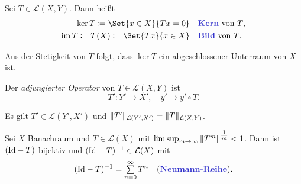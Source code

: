 \documentclass{cheat-sheet}
\newcommand{\K}{\mathbb{K}}
\newcommand{\Leb}{\mathcal{L}} %
\newcommand{\LSO}{\mathcal{L}} %
\begin{document}

\begin{defn}
  Sei $T \in \LSO(X, Y)$. Dann heißt
  \begin{align*}
    \ker T \coloneqq \Set{ x \in X }{ Tx = 0 } \quad &\text{\emph{Kern} von $T$,}\\
    \im T \coloneqq T(X) \coloneqq \Set{ Tx }{ x \in X } \quad &\text{\emph{Bild} von $T$.}
  \end{align*}
\end{defn}

\begin{bem}
  Aus der Stetigkeit von $T$ folgt, dass $\ker T$ ein abgeschlossener Unterraum von $X$ ist.
\end{bem}


\begin{defn}
  Der \emph{adjungierter Operator} von $T \in \LSO(X, Y)$ ist
  \[ T' : Y' \to X', \quad y' \mapsto y' \circ T. \]
\end{defn}

\begin{satz}
  Es gilt $T' \in \Leb(Y', X')$ und $\norm{T'}_{\LSO(Y', X')} = \norm{T}_{\LSO(X, Y)}$.
\end{satz}

\iffalse
  \begin{bsp}
    Seien $p, q \in \cinterval{1}{\infty}$ mit $\tfrac{1}{p} + \tfrac{1}{q} = 1$ und $g \in L^q(S, \K)$. Dann ist ein Funktional $T_g \in (L^p(S, \K))'$ definiert durch
    \[ T_g : L^p(S, \K) \to \K, \quad f \mapsto \Int{S}{}{f \cdot \overline{g}}{\mu}. \]
  \end{bsp}
\fi


\begin{satz}
  Sei $X$ Banachraum und $T \in \LSO(X)$ mit $\limsup_{m \to \infty} \,\lVert T^m\rVert^{\tfrac{1}{m}} < 1$. Dann ist $(\mathrm{Id} - T)$ bijektiv und $(\Id - T)^{-1} \in \LSO(X)$ mit
  \[
    (\Id - T)^{-1} = \sum_{n=0}^\infty T^n
    \quad \text{(\emph{Neumann-Reihe}).}
  \]
\end{satz}
\end{document}
